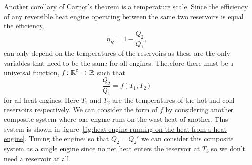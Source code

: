 \documentclass[a4paper]{article}
\begin{document}
    Another corollary of Carnot's theorem is a temperature scale.
    Since the efficiency of any reversible heat engine operating between the same two reservoirs is equal the efficiency,
    \[\eta_R = 1 - \frac{Q_2}{Q_1},\]
    can only depend on the temperatures of the reservoirs as these are the only variables that need to be the same for all engines.
    Therefore there must be a universal function, \(f\colon\mathbb{R}^2 \to \mathbb{R}\) such that
    \[\frac{Q_2}{Q_1} = f(T_1, T_2)\]
    for all heat engines.
    Here \(T_1\) and \(T_2\) are the temperatures of the hot and cold reservoirs respectively.
    We can consider the form of \(f\) by considering another composite system where one engine runs on the wast heat of another.
    This system is shown in figure~\ref{fig:heat engine running on the heat from a heat engine}.
    Tuning the engines so that \(Q_2 = Q_2'\) we can consider this composite system as a single engine since no net heat enters the reservoir at \(T_3\) so we don't need a reservoir at all.
\end{document}
